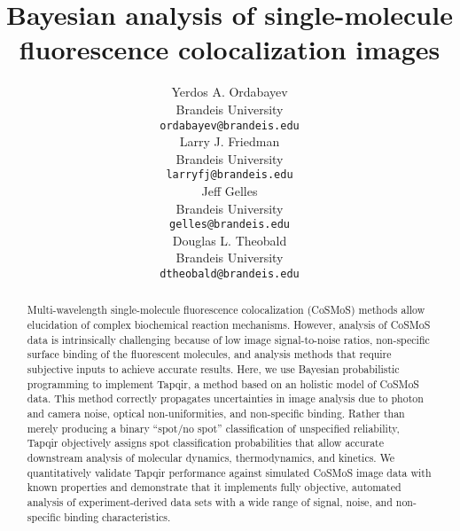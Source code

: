 \documentclass{article}
\title{Bayesian analysis of single-molecule fluorescence colocalization images}
\author{
 Yerdos A. Ordabayev \\
  Brandeis University\\
  \texttt{ordabayev@brandeis.edu} \\
   \And
 Larry  J. Friedman \\
  Brandeis University\\
  \texttt{larryfj@brandeis.edu} \\
  \And
 Jeff Gelles \\
  Brandeis University\\
  \texttt{gelles@brandeis.edu} \\
  \And
 Douglas L. Theobald \\
  Brandeis University\\
  \texttt{dtheobald@brandeis.edu} \\
}
\begin{document}
\maketitle
\begin{abstract} %
Multi-wavelength single-molecule fluorescence colocalization (CoSMoS) methods allow elucidation of complex biochemical reaction mechanisms. However, analysis of CoSMoS data is intrinsically challenging because of low image signal-to-noise ratios, non-specific surface binding of the fluorescent molecules, and analysis methods that require subjective inputs to achieve accurate results. Here, we use Bayesian probabilistic programming to implement Tapqir, a method based on an holistic model of CoSMoS data.  This method correctly propagates uncertainties in image analysis due to photon and camera noise, optical non-uniformities, and non-specific binding. Rather than merely producing a binary ``spot/no spot'' classification of unspecified reliability, Tapqir objectively assigns spot classification probabilities that allow accurate downstream analysis of molecular dynamics, thermodynamics, and kinetics.   We quantitatively validate Tapqir performance against simulated CoSMoS image data with known properties and demonstrate that it implements fully objective, automated analysis of experiment-derived data sets with a wide range of signal, noise, and non-specific binding characteristics. 
\end{abstract}


















\end{document}
